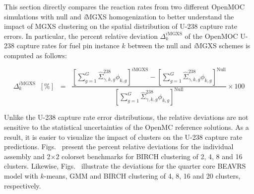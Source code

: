 This section directly compares the reaction rates from two different OpenMOC simulations with null and \textit{i}\ac{MGXS} homogenization to better understand the impact of \ac{MGXS} clustering on the spatial distribution of U-238 capture rate errors. In particular, the percent relative deviation $\Delta_{k}^{\mathrm{\textit{i}MGXS}}$ of the OpenMOC U-238 capture rates for fuel pin instance $k$ between the null and \textit{i}\ac{MGXS} schemes is computed as follows:

\begin{equation}
\label{eqn:chap11-compare-openmoc}
\Delta_{k}^{\mathrm{\textit{i}MGXS}} \;\; [\%] \;\; = \;\; \frac{\left[\displaystyle\sum\limits_{g=1}^{G} \hat{\Sigma}^{238}_{\gamma,k,g}\phi_{k,g}\right]^{\mathrm{\textit{i}MGXS}} - \left[\displaystyle\sum\limits_{g=1}^{G} \hat{\Sigma}^{238}_{\gamma,k,g}\phi_{k,g}\right]^{\mathrm{Null}}}{\left[\displaystyle\sum\limits_{g=1}^{G} \hat{\Sigma}^{238}_{\gamma,k,g}\phi_{k,g}\right]^{\mathrm{Null}}} \times 100
\end{equation}

\noindent Unlike the U-238 capture rate error distributions, the relative deviations are not sensitive to the statistical uncertainties of the OpenMC reference solutions. As a result, it is easier to visualize the impact of clusters on the U-238 capture rate predictions. Figs.~ present the percent relative deviations for the individual assembly and 2$\times$2 colorset benchmarks for BIRCH clustering of 2, 4, 8 and 16 clusters. Likewise, Figs.~ illustrate the deviations for the quarter core \ac{BEAVRS} model with $k$-means, \ac{GMM} and BIRCH clustering of 4, 8, 16 and 20 clusters, respectively.

